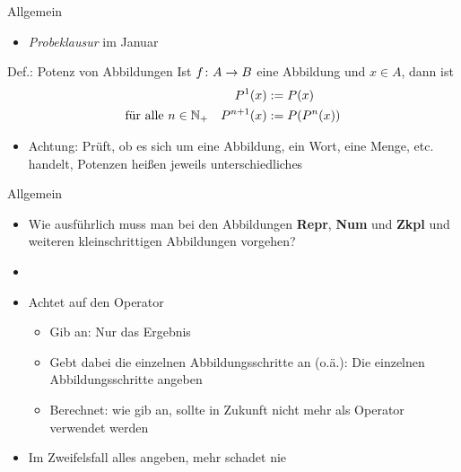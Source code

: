 \newcommand{\lul}[2]{
	\temporal<2>{#1}{\textcolor{red}{#1}}{\textcolor{kit-green100}{#2}}
}

\newcommand{\lulz}[1]{\lul{#1}{#1}}




\begin{frame}{Allgemein}
    \begin{itemize}
    	\item \emph{Probeklausur} im Januar
    \end{itemize}
    \pause
    \begin{block}{Def.: Potenz von Abbildungen}
    	Ist $f \colon A \to B$ eine Abbildung und $x \in A$, dann ist
    	\begin{align*}
    		P^1(x) &:= P(x) \\
    		\text{für alle } n\in \mathbb{N}_+ \quad P^{n+1}(x) &:= P(P^n(x))
    	\end{align*}
    \end{block}

    \begin{itemize}
    	\item \alert{Achtung}: Prüft, ob es sich um eine Abbildung, ein Wort, eine Menge, etc. handelt, Potenzen heißen jeweils unterschiedliches
    \end{itemize}

\end{frame}

\begin{frame}{Allgemein}
\begin{itemize}
	\item Wie ausführlich muss man bei den Abbildungen \textbf{Repr}, \textbf{Num} und \textbf{Zkpl} und weiteren kleinschrittigen Abbildungen vorgehen?
	\item[]
	\item Achtet auf den Operator
	\begin{itemize}
		\item Gib an: Nur das Ergebnis
		\item Gebt dabei die einzelnen Abbildungsschritte an (o.ä.): Die einzelnen Abbildungsschritte angeben
		\item Berechnet: wie gib an, sollte in Zukunft nicht mehr als Operator verwendet werden
	\end{itemize}
	\item Im Zweifelsfall alles angeben, mehr schadet nie
\end{itemize}
\end{frame}




